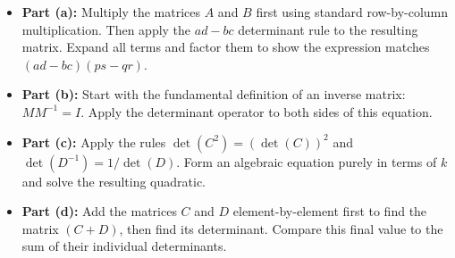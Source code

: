 \begin{hint}
\begin{itemize}
    \item \textbf{Part (a):} Multiply the matrices $A$ and $B$ first using standard row-by-column multiplication. Then apply the $ad-bc$ determinant rule to the resulting matrix. Expand all terms and factor them to show the expression matches $(ad-bc)(ps-qr)$.
    \item \textbf{Part (b):} Start with the fundamental definition of an inverse matrix: $M M^{-1} = I$. Apply the determinant operator to both sides of this equation.
    \item \textbf{Part (c):} Apply the rules $\det(C^2) = (\det(C))^2$ and $\det(D^{-1}) = 1/\det(D)$. Form an algebraic equation purely in terms of $k$ and solve the resulting quadratic.
    \item \textbf{Part (d):} Add the matrices $C$ and $D$ element-by-element first to find the matrix $(C+D)$, then find its determinant. Compare this final value to the sum of their individual determinants.
\end{itemize}
\end{hint}

